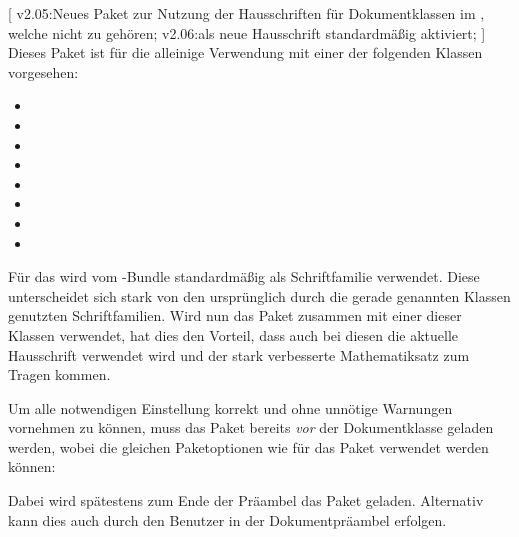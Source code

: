 \begin{DeclareEntity}{}
[
  v2.05:Neues Paket zur Nutzung der Hausschriften für Dokumentklassen im 
  \TUDCD, welche nicht zu \TUDScript gehören;
  v2.06:\OpenSans als neue Hausschrift standardmäßig aktiviert;
]
Dieses Paket ist für die alleinige Verwendung mit einer der folgenden Klassen 
vorgesehen:
\begin{itemize}
\item {}
\item {}
\item {}
\item {}
\item {}
\item {}
\item {}
\item {}
\end{itemize}

%
Für das \TUDCD wird vom \TUDScript-Bundle standardmäßig \OpenSans als 
Schriftfamilie verwendet. Diese unterscheidet sich stark von den ursprünglich 
durch die gerade genannten Klassen genutzten Schriftfamilien. Wird nun das 
Paket  zusammen mit einer dieser Klassen verwendet, 
hat dies den Vorteil, dass auch bei diesen die aktuelle Hausschrift verwendet 
wird und der stark verbesserte Mathematiksatz zum Tragen kommen.

Um alle notwendigen Einstellung korrekt und ohne unnötige Warnungen vornehmen 
zu können, muss das Paket  bereits \emph{vor} der 
Dokumentklasse geladen werden, wobei die gleichen Paketoptionen wie für das 
Paket  verwendet werden können:
%
%
Dabei wird spätestens zum Ende der Präambel das Paket  
geladen. Alternativ kann dies auch durch den Benutzer in der Dokumentpräambel 
erfolgen.
\end{DeclareEntity}
